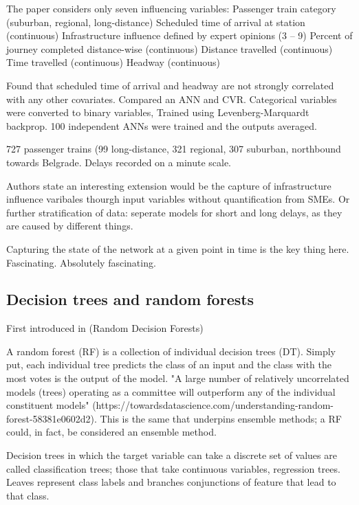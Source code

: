\documentclass{article}
\begin{document}
The paper considers only seven influencing variables:
Passenger train category (suburban, regional, long-distance)
Scheduled time of arrival at station (continuous)
Infrastructure influence defined by expert opinions (3 – 9)
Percent of journey completed distance-wise (continuous)
Distance travelled (continuous)
Time travelled (continuous)
Headway (continuous)

Found that scheduled time of arrival and headway are not strongly correlated with any other covariates. Compared an ANN and CVR. Categorical variables were converted to binary variables, Trained using Levenberg-Marquardt backprop. 100 independent ANNs were trained and the outputs averaged. 

727 passenger trains (99 long-distance, 321 regional, 307 suburban, northbound towards Belgrade. Delays recorded on a minute scale. 

Authors state an interesting extension would be the capture of infrastructure influence varibales thourgh input variables without quantification from SMEs. Or further stratification of data: seperate models for short and long delays, as they are caused by different things. 

Capturing the state of the network at a given point in time is the key thing here. Fascinating. Absolutely fascinating. 

\subsection{Decision trees and random forests}

First introduced in \cite{ho_1995} (Random Decision Forests)

A random forest (RF) is a collection of individual decision trees (DT). Simply put, each individual tree predicts the class of an input and the class with the most votes is the output of the model. "A large number of relatively uncorrelated models (trees) operating as a committee will outperform any of the individual constituent models" (https://towardsdatascience.com/understanding-random-forest-58381e0602d2). This is the same that underpins ensemble methods; a RF could, in fact, be considered an ensemble method. 

Decision trees in which the target variable can take a discrete set of values are called classification trees; those that take continuous variables, regression trees. Leaves represent class labels and branches conjunctions of feature that lead to that class. 
\end{document}
